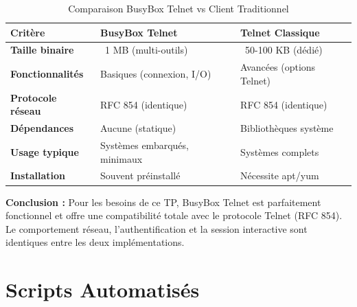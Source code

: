 \documentclass[12pt,a4paper,openany]{report}
\newcommand{\tableheadcolor}{\rowcolor{tableheadbg}}
\begin{document}
	\begin{table}[H]
		\centering
		\renewcommand{\arraystretch}{1.5}
		\setlength{\arrayrulewidth}{0.5pt}
		\begin{tabular}{>{\bfseries}p{4cm} p{5cm} p{5cm}}
			\arrayrulecolor{tableborder}
			\hline
			\tableheadcolor
			\textcolor{tableheadfg}{\textbf{Critère}} &
			\textcolor{tableheadfg}{\textbf{BusyBox Telnet}} &
			\textcolor{tableheadfg}{\textbf{Telnet Classique}} \\
			\hline
			\rowcolor{tablerowalt}
			Taille binaire & ~1 MB (multi-outils) & ~50-100 KB (dédié) \\
			
			Fonctionnalités & Basiques (connexion, I/O) & Avancées (options Telnet) \\
			
			\rowcolor{tablerowalt}
			Protocole réseau & RFC 854 (identique) & RFC 854 (identique) \\
			
			Dépendances & Aucune (statique) & Bibliothèques système \\
			
			\rowcolor{tablerowalt}
			Usage typique & Systèmes embarqués, minimaux & Systèmes complets \\
			
			Installation & Souvent préinstallé & Nécessite apt/yum \\
			\hline
		\end{tabular}
		\caption{Comparaison BusyBox Telnet vs Client Traditionnel}
	\end{table}
	
	\textbf{Conclusion :} Pour les besoins de ce TP, BusyBox Telnet est parfaitement 
	fonctionnel et offre une compatibilité totale avec le protocole Telnet (RFC 854). 
	Le comportement réseau, l'authentification et la session interactive sont identiques 
	entre les deux implémentations.
	
	
		
	\section{Scripts Automatisés}
	
\end{document}
